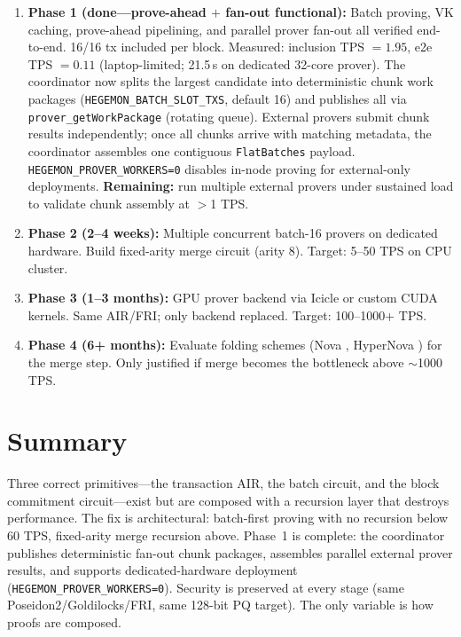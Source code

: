 \documentclass[11pt]{article}
\begin{document}
\begin{enumerate}[leftmargin=2em]
  \item \textbf{Phase 1 (done---prove-ahead $+$ fan-out functional):}
        Batch proving, VK caching, prove-ahead pipelining, and parallel
        prover fan-out all verified end-to-end. 16/16 tx included per
        block. Measured: inclusion TPS $= 1.95$, e2e TPS $= 0.11$
        (laptop-limited; 21.5\,s on dedicated 32-core prover).
        The coordinator now splits the largest candidate into
        deterministic chunk work packages
        (\texttt{HEGEMON\_BATCH\_SLOT\_TXS}, default 16) and publishes
        all via \texttt{prover\_getWorkPackage} (rotating queue).
        External provers submit chunk results independently;
        once all chunks arrive with matching metadata, the coordinator
        assembles one contiguous \texttt{FlatBatches} payload.
        \texttt{HEGEMON\_PROVER\_WORKERS=0} disables in-node proving
        for external-only deployments.
        \textbf{Remaining:} run multiple external provers under
        sustained load to validate chunk assembly at $>$1 TPS.

  \item \textbf{Phase 2 (2--4 weeks):}
        Multiple concurrent batch-16 provers on dedicated hardware.
        Build fixed-arity merge circuit (arity 8).
        Target: 5--50 TPS on CPU cluster.

  \item \textbf{Phase 3 (1--3 months):}
        GPU prover backend via Icicle \cite{ingonyama2024} or custom
        CUDA kernels. Same AIR/FRI; only backend replaced.
        Target: 100--1000+ TPS.

  \item \textbf{Phase 4 (6+ months):}
        Evaluate folding schemes (Nova \cite{nova2022}, HyperNova
        \cite{hypernova2023}) for the merge step. Only justified if
        merge becomes the bottleneck above $\sim$1000 TPS.
\end{enumerate}

\section*{Summary}

Three correct primitives---the transaction AIR, the batch circuit, and the
block commitment circuit---exist but are composed with a recursion layer that
destroys performance. The fix is architectural: batch-first proving with no
recursion below 60 TPS, fixed-arity merge recursion above. Phase~1 is
complete: the coordinator publishes deterministic fan-out chunk packages,
assembles parallel external prover results, and supports dedicated-hardware
deployment (\texttt{HEGEMON\_PROVER\_WORKERS=0}). Security is
preserved at every stage (same Poseidon2/Goldilocks/FRI, same 128-bit PQ
target). The only variable is how proofs are composed.
\end{document}
